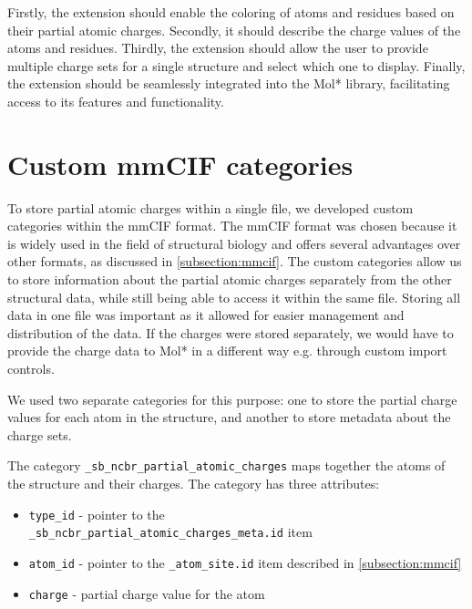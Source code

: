 \documentclass[
  digital,     %
  oneside,     %
  nosansbold,  %
  nocolorbold, %
  lof,         %
  lot,         %
]{fithesis4}
\begin{document}

Firstly, the extension should enable the coloring of atoms and residues based on their partial atomic charges. Secondly, it should describe the charge values of the atoms and residues. Thirdly, the extension should allow the user to provide multiple charge sets for a single structure and select which one to display. Finally, the extension should be seamlessly integrated into the Mol* library, facilitating access to its features and functionality.

\section{Custom mmCIF categories}
\label{section:custom_mmcif_categories}

To store partial atomic charges within a single file, we developed custom categories within the mmCIF format. The mmCIF format was chosen because it is widely used in the field of structural biology and offers several advantages over other formats, as discussed in \ref{subsection:mmcif}. The custom categories allow us to store information about the partial atomic charges separately from the other structural data, while still being able to access it within the same file. Storing all data in one file was important as it allowed for easier management and distribution of the data. If the charges were stored separately, we would have to provide the charge data to Mol* in a different way e.g. through custom import controls.


We used two separate categories for this purpose: one to store the partial charge values for each atom in the structure, and another to store metadata about the charge sets.

The category \texttt{\_sb\_ncbr\_partial\_atomic\_charges} maps together the atoms of the structure and their charges. The category has three attributes:

\begin{itemize}
  \item \texttt{type\_id} - pointer to the \\ \texttt{\_sb\_ncbr\_partial\_atomic\_charges\_meta.id} item
  \item \texttt{atom\_id} - pointer to the \texttt{\_atom\_site.id} item described in \ref{subsection:mmcif}
  \item \texttt{charge} - partial charge value for the atom
\end{itemize}
\end{document}

